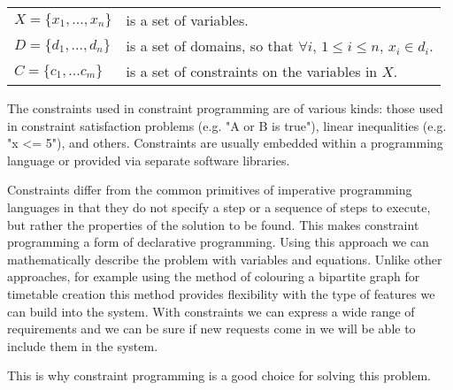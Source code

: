 \begin{center}
\begin{tabular}{ll}
$X=\{x_1, ..., x_n\}$ & is a set of variables.\\
$D=\{d_1, ..., d_n\}$ & is a set of domains, so that $\forall{}i$, $1\leq{}i\leq{}n$, $x_i \in{} d_i$.\\
$C=\{c_1, ... c_m\}$  & is a set of constraints on the variables in $X$.\\
\end{tabular}
\end{center}

The constraints used in constraint programming are of various kinds: those used in constraint satisfaction problems (e.g. "A or B is true"), linear inequalities (e.g. "x <= 5"), and others. Constraints are usually embedded within a programming language or provided via separate software libraries.

Constraints differ from the common primitives of imperative programming languages in that they do not specify a step or a sequence of steps to execute, but rather the properties of the solution to be found. This makes constraint programming a form of declarative programming. Using this approach we can mathematically describe the problem with variables and equations. Unlike other approaches, for example using the method of colouring a bipartite graph for timetable creation this method provides flexibility with the type of features we can build into the system. With constraints we can express a wide range of requirements and we can be sure if new requests come in we will be able to include them in the system.

This is why constraint programming is a good choice for solving this problem.

